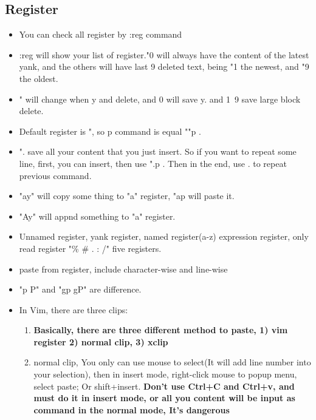 \documentclass[a4paper,12pt,twoside]{book}
\begin{document}
\subsection{Register}
	\begin{itemize}
			\item You can check all register by :reg command 

		\item :reg will show your list of register."0 will always have the content of the latest yank, and the others will have last 9 deleted text, being "1 the newest, and "9 the oldest.

			\item " will change when y and delete, and 0 will save y. and 1~9 save large block delete. 

			\item Default register is ", so p command is equal ""p .

			\item ". save all your content that you just insert. So if you want to repeat some line, first, you can insert, then use ".p . Then in the end, use . to repeat previous command. 

			\item "ay" will copy some thing to "a" register, "ap will paste it.
					
			\item "Ay" will appnd something to "a" register.

			\item Unnamed register, yank register,  named register(a-z) expression register, only read register "\% \# . : /" five registers. 
					
			\item paste from register,  include character-wise and line-wise 
					
			\item "p P" and "gp  gP" are difference. 
					
\item In Vim, there are three clips:
				\begin{enumerate}
						\item \textbf{Basically, there are three different method to paste, 1) vim register 2) normal clip, 3) xclip} 
						\item normal clip, You only can use mouse to select(It will add line number into your selection), then in insert mode, right-click mouse to popup menu, select paste; Or shift+insert. \textbf{Don't use Ctrl+C and Ctrl+v, and must do it in insert mode, or all you content will be input as command in the normal mode, It's dangerous}


\end{enumerate}
\end{itemize}
\end{document}
